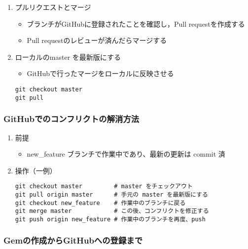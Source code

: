 \documentclass{bxjsarticle}
\begin{document}
\begin{enumerate}
\item プルリクエストとマージ
\label{sec-3-2-6-1}

\begin{itemize}
\item ブランチがGitHubに登録されたことを確認し，Pull requestを作成する
\item Pull requestのレビューが済んだらマージする
\end{itemize}

\item ローカルのmaster を最新版にする
\label{sec-3-2-6-2}

\begin{itemize}
\item GitHubで行ったマージをローカルに反映させる
\end{itemize}

\begin{verbatim}
git checkout master
git pull
\end{verbatim}
\end{enumerate}

\subsubsection{GitHubでのコンフリクトの解消方法}
\label{sec-3-2-7}
\begin{enumerate}
\item 前提
\label{sec-3-2-7-1}
\begin{itemize}
\item new\_feature ブランチで作業中であり、最新の更新は commit 済
\end{itemize}

\item 操作（一例）
\label{sec-3-2-7-2}

\begin{verbatim}
git checkout master         # master をチェックアウト
git pull origin master      # 手元の master を最新版にする
git checkout new_feature    # 作業中のブランチに戻る
git merge master            # この後、コンフリクトを修正する
git push origin new_feature # 作業中のブランチを再度、push
\end{verbatim}
\end{enumerate}


\subsubsection{Gemの作成からGitHubへの登録まで}
\label{sec-3-2-8}
\end{document}
